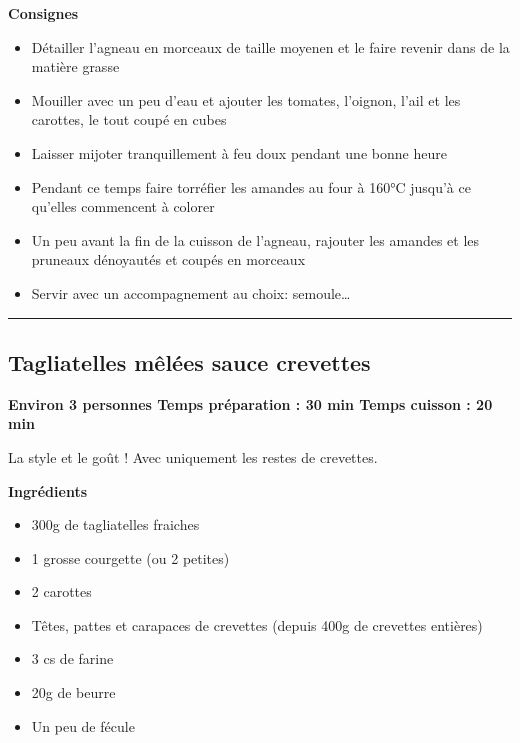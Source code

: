 \documentclass[]{book}
\providecommand{\tightlist}{%
  \setlength{\itemsep}{0pt}\setlength{\parskip}{0pt}}
\begin{document}
\textbf{Consignes}

\begin{itemize}
\tightlist
\item
  Détailler l'agneau en morceaux de taille moyenen et le faire revenir dans de la matière grasse
\item
  Mouiller avec un peu d'eau et ajouter les tomates, l'oignon, l'ail et les carottes, le tout coupé en cubes
\item
  Laisser mijoter tranquillement à feu doux pendant une bonne heure
\item
  Pendant ce temps faire torréfier les amandes au four à 160°C jusqu'à ce qu'elles commencent à colorer
\item
  Un peu avant la fin de la cuisson de l'agneau, rajouter les amandes et les pruneaux dénoyautés et coupés en morceaux
\item
  Servir avec un accompagnement au choix: semoule\ldots{}
\end{itemize}

\begin{center}\rule{0.5\linewidth}{0.5pt}\end{center}

\hypertarget{tagliatelles-muxealuxe9es-sauce-crevettes}{%
\subsection*{\texorpdfstring{{Tagliatelles mêlées sauce crevettes}}{Tagliatelles mêlées sauce crevettes}}\label{tagliatelles-muxealuxe9es-sauce-crevettes}}

\begin{salebox}
\textbf{Environ 3 personnes \textbar{} Temps préparation : 30 min
\textbar{} Temps cuisson : 20 min}

La style et le goût ! Avec uniquement les restes de crevettes.
\end{salebox}

\textbf{Ingrédients}

\begin{itemize}
\tightlist
\item
  300g de tagliatelles fraiches
\item
  1 grosse courgette (ou 2 petites)
\item
  2 carottes
\item
  Têtes, pattes et carapaces de crevettes (depuis 400g de crevettes entières)
\item
  3 cs de farine
\item
  20g de beurre
\item
  Un peu de fécule
\end{itemize}
\end{document}
